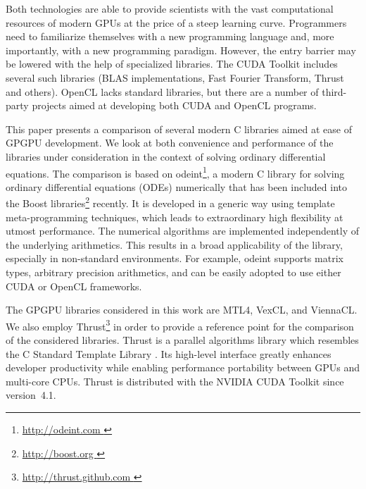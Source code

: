 \documentclass[final]{siamltex}
\newcommand{\addpp}[1]{{#1\nolinebreak[4]\hspace{-.05em}\raisebox{.4ex}{\tiny\bf ++}}\xspace}
\newcommand{\Cpp}{\addpp{C}}
\begin{document}
Both technologies are able to provide scientists with the vast computational
resources of modern GPUs at the price of a steep learning curve.  Programmers
need to familiarize themselves with a new programming language and, more
importantly, with a new programming paradigm. However, the entry barrier may be
lowered with the help of specialized libraries. The CUDA Toolkit includes
several such libraries (BLAS implementations, Fast Fourier Transform, Thrust
and others). OpenCL lacks standard libraries, but there are a number of
third-party projects aimed at developing both CUDA and OpenCL programs.



This paper presents a comparison of several modern \Cpp libraries aimed at ease
of GPGPU development. We look at both convenience and performance of the
libraries under consideration in the context of solving ordinary differential
equations.  The comparison is based on odeint\footnote{\href{
http://odeint.com }{ http://odeint.com } }, a modern \Cpp library for solving
ordinary differential equations (ODEs) numerically  \cite{OdeintRef2,OdeintRef1}
that has been included into the Boost
libraries\footnote{ \href{ http://boost.org } { http://boost.org } } recently.
It is developed in a generic way using template meta-programming techniques,
which leads to extraordinary high flexibility at utmost performance. The
numerical algorithms are implemented independently of the underlying
arithmetics. This results in a broad applicability of the library, especially
in non-standard environments.  For example, odeint supports matrix types,
arbitrary precision arithmetics, and can be easily adopted to use either CUDA
or OpenCL frameworks.

The GPGPU libraries considered in this work are MTL4, VexCL, and ViennaCL. We
also employ Thrust\footnote{ \href{ http://thrust.github.com }{
http://thrust.github.com }} in order to provide a reference point for the
comparison of the considered libraries.  Thrust is a parallel algorithms
library which resembles the \Cpp Standard Template Library \cite{ThrustRef}.
Its high-level interface greatly enhances developer productivity while enabling
performance portability between GPUs and multi-core CPUs.  Thrust is
distributed with the NVIDIA CUDA Toolkit since version~4.1.
\end{document}

